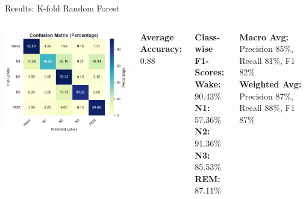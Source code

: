 \begin{frame}{Results: K-fold Random Forest}
	\begin{columns}
		\centering
		\includegraphics[width=\linewidth]{"images/paper_1/Random Forest 1.1"}
		
		\scriptsize
		\textbf{Average Accuracy:} 0.88
		
		\vspace{0.3em}
		\textbf{Class-wise F1-Scores:} \\
		\textbf{Wake:} 90.43\% \\
		\textbf{N1:} 57.36\% \\
		\textbf{N2:} 91.36\% \\
		\textbf{N3:} 85.53\% \\
		\textbf{REM:} 87.11\% 
		
		\vspace{0.3em}
		\textbf{Macro Avg:} Precision 85\%, Recall 81\%, F1 82\% \\
		\textbf{Weighted Avg:} Precision 87\%, Recall 88\%, F1 87\%
	\end{columns}
\end{frame}


